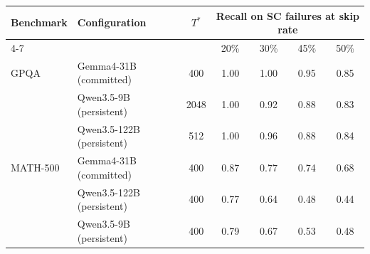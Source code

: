 \begin{tabular}{llccccc}
\toprule
Benchmark & Configuration & $T^\ast$ & \multicolumn{4}{c}{Recall on SC failures at skip rate} \\
\cmidrule(lr){4-7}
 &  &  & 20\% & 30\% & 45\% & 50\% \\
\midrule
GPQA & Gemma4-31B (committed) & 400 & 1.00 & 1.00 & 0.95 & 0.85 \\
 & Qwen3.5-9B (persistent) & 2048 & 1.00 & 0.92 & 0.88 & 0.83 \\
 & Qwen3.5-122B (persistent) & 512 & 1.00 & 0.96 & 0.88 & 0.84 \\
MATH-500 & Gemma4-31B (committed) & 400 & 0.87 & 0.77 & 0.74 & 0.68 \\
 & Qwen3.5-122B (persistent) & 400 & 0.77 & 0.64 & 0.48 & 0.44 \\
 & Qwen3.5-9B (persistent) & 400 & 0.79 & 0.67 & 0.53 & 0.48 \\
\bottomrule
\end{tabular}
